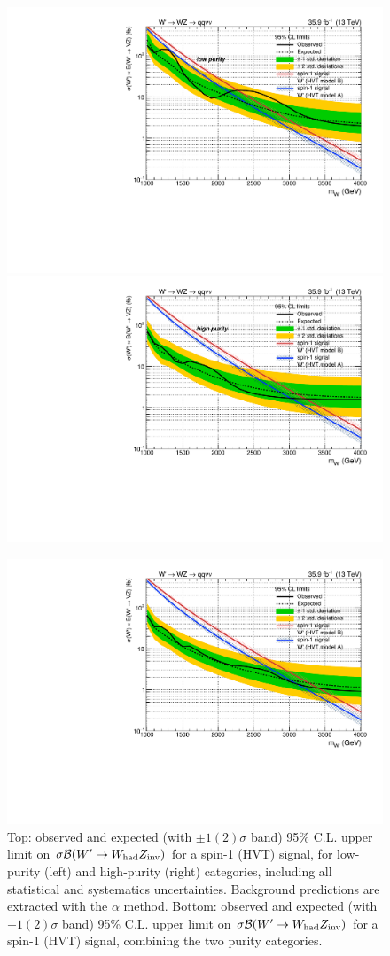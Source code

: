 \begin{figure}[!htb]
  \begin{center}
     \includegraphics[width=.495\textwidth]{plotsAlpha_tesi/Limits/Exclusion_XWZInv_XVZnnlp_asymptotic.pdf}%
     \includegraphics[width=.495\textwidth]{plotsAlpha_tesi/Limits/Exclusion_XWZInv_XVZnnhp_asymptotic.pdf}

     \includegraphics[width=.495\textwidth]{plotsAlpha_tesi/Limits/Exclusion_XWZInv_XVZnn_asymptotic.pdf}
  \end{center}
  \caption{Top: observed and expected (with $\pm1(2)\sigma$ band) 95\% C.L. upper limit on $\sigma \mathcal{B} (W' \rightarrow W_{\text{had}} Z_{\text{inv}})$ for a spin-1 (HVT) signal, for low-purity (left) and high-purity (right) categories, including all statistical and systematics uncertainties. Background predictions are extracted with the $\alpha$ method. Bottom: observed and expected (with $\pm1(2)\sigma$ band) 95\% C.L. upper limit on $\sigma \mathcal{B} (W' \rightarrow W_{\text{had}} Z_{\text{inv}})$ for a spin-1 (HVT) signal, combining the two purity categories.}
  \label{fig:Limit_XWZInv}
\end{figure}


